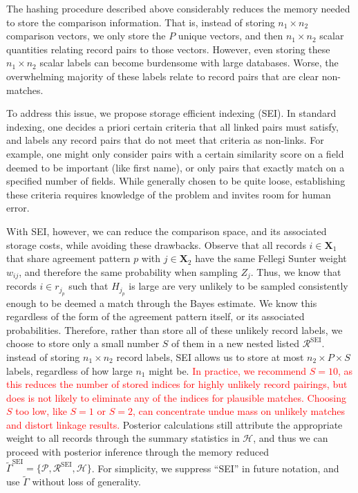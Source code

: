 \documentclass[ba]{imsart}
\begin{document}
The hashing procedure described above considerably reduces the memory needed to store the comparison information. That is, instead of storing \(n_1 \times n_2\) comparison vectors, we only store the \(P\) unique vectors, and then \(n_1 \times n_2\) scalar quantities relating record pairs to those vectors. However, even storing these \(n_1 \times n_2\) scalar labels can become burdensome with large databases. Worse, the overwhelming majority of these labels relate to record pairs that are clear non-matches.

To address this issue, we propose storage efficient indexing (SEI). In standard indexing, one decides a priori certain criteria that all linked pairs must satisfy, and labels any record pairs that do not meet that criteria as non-links. For example, one might only consider pairs with a certain similarity score on a field deemed to be important (like first name), or only pairs that exactly match on a specified number of fields. While generally chosen to be quite loose, establishing these criteria requires knowledge of the problem and invites room for human error. 

With SEI, however, we can reduce the comparison space, and its associated storage costs, while avoiding these drawbacks. Observe that all records $i \in \bm{X}_1$ that share agreement pattern $p$ with $j \in \bm{X}_2$ have the same Fellegi Sunter weight $w_{ij}$, and therefore the same probability when sampling \(Z_j\). Thus, we know that records $i \in r_{j_p}$  such that $H_{j_p}$ is large are very unlikely to be sampled consistently enough to be deemed a match through the Bayes estimate. We know this regardless of the form of the agreement pattern itself, or its associated probabilities. Therefore, rather than store all of these unlikely record labels, we choose to store only a small number \(S\) of them in a new nested listed $\mathcal{R}^{\text{SEI}}$. instead of storing \(n_1 \times n_2\) record labels, SEI allows us to store at most \(n_2 \times P \times S\) labels, regardless of how large \(n_1\) might be. \textcolor{red}{In practice, we recommend $S=10$, as this reduces the number of stored indices for highly unlikely record pairings, but does is not likely to eliminate any of the indices for plausible matches. Choosing $S$ too low, like $S=1$ or $S=2$, can concentrate undue mass on unlikely matches and distort linkage results.} Posterior calculations still attribute the appropriate weight to all records through the summary statistics in $\mathcal{H}$, and thus we can proceed with posterior inference through the memory reduced $\tilde{\Gamma}^{\text{SEI}} = \{\mathcal{P}, \mathcal{R}^{\text{SEI}}, \mathcal{H}\}$. For simplicity, we suppress ``SEI'' in future notation, and use $\tilde{\Gamma}$ without loss of generality. 
\end{document}
